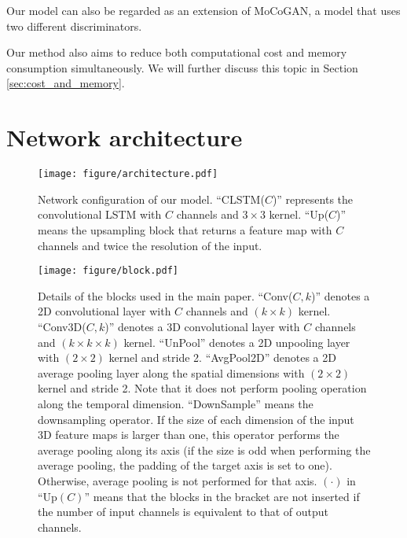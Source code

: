 \documentclass[twocolumn]{svjour3}
\def\Sec#1{Section \ref{sec:#1}}
\begin{document}
Our model can also be regarded as an extension of MoCoGAN, a model that uses two different discriminators.

Our method also aims to reduce both computational cost and memory consumption simultaneously.
We will further discuss this topic in \Sec{cost_and_memory}.















\section{Network architecture}
\label{sec:videonet}
\begin{figure*}[t!]
\centering
  \texttt{[image: figure/architecture.pdf]}
  \caption{Network configuration of our model. ``CLSTM($C$)'' represents the convolutional LSTM with $C$ channels and $3 \times 3$ kernel. ``Up($C$)'' means the upsampling block that returns a feature map with $C$ channels and twice the resolution of the input.}
\label{fig:network}

\end{figure*}
\begin{figure*}[t]
\centering
  \texttt{[image: figure/block.pdf]}
  \caption{Details of the blocks used in the main paper. ``Conv($C, k$)'' denotes a 2D convolutional layer with $C$ channels and $(k \times k)$ kernel. ``Conv3D($C, k$)'' denotes a 3D convolutional layer with $C$ channels and $(k \times k \times k)$ kernel. ``UnPool'' denotes a 2D unpooling layer with $(2 \times 2)$ kernel and stride 2. ``AvgPool2D'' denotes a 2D  average pooling layer along the spatial dimensions with $(2 \times 2)$ kernel and stride 2. Note that it does not perform pooling operation along the temporal dimension. ``DownSample'' means the downsampling operator. If the size of each dimension of the input 3D feature maps is larger than one, this operator performs the average pooling along its axis (if the size is odd when performing the average pooling, the padding of the target axis is set to one). Otherwise, average pooling is not performed for that axis. $(\cdot)$ in ``Up$(C)$'' means that the blocks in the bracket are not inserted if the number of input channels is equivalent to that of output channels.}
  \label{fig:blocks}
\end{figure*}
\end{document}
